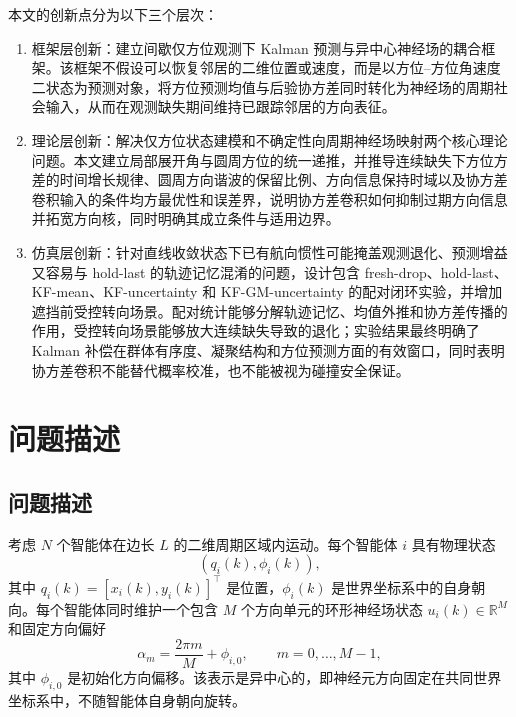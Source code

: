 \documentclass[UTF8,fontset=windows,11pt]{ctexart}
\begin{document}
本文的创新点分为以下三个层次：
\begin{enumerate}[label=(\arabic*)]
  \item 框架层创新：建立间歇仅方位观测下 Kalman 预测与异中心神经场的耦合框架。该框架不假设可以恢复邻居的二维位置或速度，而是以方位--方位角速度二状态为预测对象，将方位预测均值与后验协方差同时转化为神经场的周期社会输入，从而在观测缺失期间维持已跟踪邻居的方向表征。
  \item 理论层创新：解决仅方位状态建模和不确定性向周期神经场映射两个核心理论问题。本文建立局部展开角与圆周方位的统一递推，并推导连续缺失下方位方差的时间增长规律、圆周方向谐波的保留比例、方向信息保持时域以及协方差卷积输入的条件均方最优性和误差界，说明协方差卷积如何抑制过期方向信息并拓宽方向核，同时明确其成立条件与适用边界。
  \item 仿真层创新：针对直线收敛状态下已有航向惯性可能掩盖观测退化、预测增益又容易与 hold-last 的轨迹记忆混淆的问题，设计包含 fresh-drop、hold-last、KF-mean、KF-uncertainty 和 KF-GM-uncertainty 的配对闭环实验，并增加遮挡前受控转向场景。配对统计能够分解轨迹记忆、均值外推和协方差传播的作用，受控转向场景能够放大连续缺失导致的退化；实验结果最终明确了 Kalman 补偿在群体有序度、凝聚结构和方位预测方面的有效窗口，同时表明协方差卷积不能替代概率校准，也不能被视为碰撞安全保证。
\end{enumerate}

\clearpage

\section{问题描述}

\subsection{问题描述}

考虑 $N$ 个智能体在边长 $L$ 的二维周期区域内运动。每个智能体 $i$ 具有物理状态
\begin{equation}
 (q_i(k),\phi_i(k)),
\end{equation}
其中 $q_i(k)=[x_i(k),y_i(k)]^\top$ 是位置，$\phi_i(k)$ 是世界坐标系中的自身朝向。每个智能体同时维护一个包含 $M$ 个方向单元的环形神经场状态 $u_i(k)\in\mathbb R^M$ 和固定方向偏好
\begin{equation}
 \alpha_m=\frac{2\pi m}{M}+\phi_{i,0},\qquad m=0,\ldots,M-1,
\end{equation}
其中 $\phi_{i,0}$ 是初始化方向偏移。该表示是异中心的，即神经元方向固定在共同世界坐标系中，不随智能体自身朝向旋转。
\end{document}

